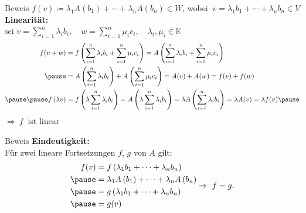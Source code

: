 \documentclass[AERbeamer%
,optBeamerClassicFormat%
,optLeftEquations   %
]{AERlatex}
\begin{document}
%
    \begin{frame}{Beweis}
        \setlength{\baselineskip}{1.6\baselineskip}
%
        $f(v)\coloneqq\lambda_1 A\left(b_1\right)+\cdots+\lambda_n A\left(b_n\right) \in W$, wobei
        $~v=\lambda_1 b_1+\cdots+\lambda_n b_n \in V$ \\
        \vspace{0.5em}
        \textbf{Linearität:} \\
        sei $v=\sum_{i=1}^n \lambda_i b_i, \quad w=\sum_{i=1}^n \mu_i c_i, \quad \lambda_i, \mu_i \in \mathbb{K}$ \pause
        \begin{equation*}
            \begin{aligned}
                f(v+w) &=f\left(\sum_{i=1}^n \lambda_i b_i+\sum_{i=1}^n \mu_i c_i\right)=A\left(\sum_{i=1}^n \lambda_i b_i+\sum_{i=1}^n \mu_i c_i\right) \\ \pause
                &=A\left(\sum_{i=1}^n \lambda_i b_i\right)+A\left(\sum_{i=1}^n \mu_i c_i\right)=A(v)+A(w) = f(v)+f(w) \\ \pause \pause
                f\left(\lambda v\right) &=f\left(\lambda \sum_{i=1}^n \lambda_i b_i\right)=A\left(\lambda \sum_{i=1}^n \lambda_i b_i\right)=\lambda A\left(\sum_{i=1}^n \lambda_i b_i\right)=\lambda A(v)=\lambda f(v) \pause
            \end{aligned}
        \end{equation*}
        $\Rightarrow ~ f ~$ ist linear
    \end{frame}
%
    \begin{frame}{Beweis}
        \setlength{\baselineskip}{1.6\baselineskip}
%
        \textbf{Eindeutigkeit:} \\
        Für zwei lineare Fortsetzungen $f$, $g$ von $A$ gilt:
        \begin{equation*}
            \begin{aligned}
                f(v) &=f\left(\lambda_1 b_1+\cdots+\lambda_n b_n\right) \\ \pause
                &=\lambda_1 A\left(b_1\right)+\cdots+\lambda_n A\left(b_n\right) \\ \pause
                &=g\left(\lambda_1 b_1+\cdots+\lambda_n b_n\right) \\ \pause
                &=g(v)
            \end{aligned} \\
            \Rightarrow ~ f=g.
        \end{equation*}
    \end{frame}
%
\end{document}
